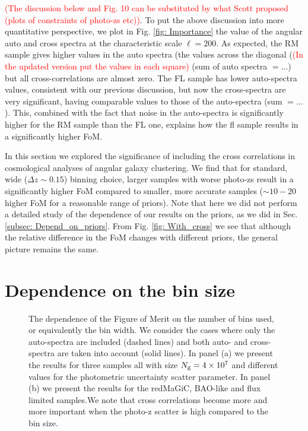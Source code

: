 \documentclass[a4paper,fleqn,usenatbib]{mnras}
\begin{document}
\textcolor{red}{(The discussion below and Fig. 10 can be substituted by what Scott proposed (plots of constraints of photo-zs etc))}. To put the above discussion into  more quantitative perspective, we plot in Fig. \ref{fig: Importance} the value of the angular auto and cross spectra at the characteristic scale $\ell = 200$. As expected, the RM sample gives higher values in the auto spectra (the values across the diagonal (\textcolor{red}{(In the updated version put the values in each square)} (sum of auto spectra $= \dots$) but all cross-correlations are almost zero. The FL sample has lower auto-spectra values, consistent with our previous discussion,  but now the cross-spectra are very significant, having comparable values to those of the auto-spectra (sum $= \dots$). This, combined  with the fact that noise in the auto-spectra is significantly higher for the RM sample than the FL one, explains how the fl sample results in a significantly higher FoM.

In this section we explored the significance of including the cross correlations in cosmological analyses of angular galaxy clustering. We find that for standard, wide ($\Delta z \sim 0.15$) binning choice, larger samples with worse photo-zs result in a significantly higher FoM compared to smaller, more accurate samples ($\sim 10-20$  higher FoM for a reasonable range of priors). Note that here we did not perform a detailed study of the dependence of our results on the priors, as we did in Sec. \ref{subsec: Depend_on_priors}. From Fig. \ref{fig: With_cross} we see that although the relative difference in the FoM changes with different priors, the general picture remains the same. 


\section{Dependence on the bin size}



\begin{figure*}
\centering
{}
\caption{The dependence of the Figure of Merit on the number of bins used, or equivalently the bin width. We consider  the cases where only the auto-spectra are included (dashed lines) and both auto- and cross-spectra are taken into account (solid lines). In panel (a) we present the results for three samples all with size $N_{\mbox{\scriptsize{g}}} = 4 \times 10^7$ and different values for the photometric uncertainty scatter parameter. In panel (b) we present the results for the redMaGiC, BAO-like and flux limited samples.We note  that cross correlations become more and more important when the photo-z scatter is high compared to the bin size.   }
\label{fig: Number_of_bins}
\end{figure*}
\end{document}
